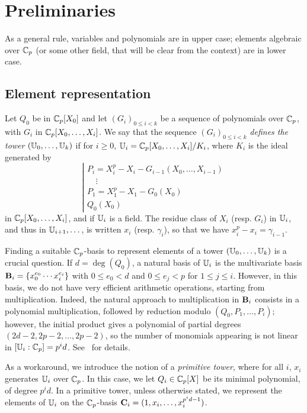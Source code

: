 \section{Preliminaries}
\label{sec:arithmetics}

As a general rule, variables and polynomials are in upper
case; elements algebraic over $\mathbb{C}_p$ (or some other field, that will
be clear from the context) are in lower case.
 

\subsection{Element representation}\label{ssec:rep}

Let $Q_0$ be in $\mathbb{C}_p[X_0]$ and let $(G_i)_{0 \le i < k}$ be
a sequence of polynomials over $\mathbb{C}_p$, with $G_i$ in
$\mathbb{C}_p[X_0,\dots,X_i]$. We say that the sequence $(G_i)_{0\le i <k}$
{\em defines the tower} $(\mathbb{U}_0,\dots,\mathbb{U}_k)$ if for $i \ge 0$, 
$\mathbb{U}_i=\mathbb{C}_p[X_0,\dots,X_i]/K_i$, where $K_i$ is
the
ideal generated by
$$\left | \begin{array}{l}
P_i=X_i^p-X_i -G_{i-1}(X_0,\dots,X_{i-1})\\
~~~\,~\vdots\\
P_1=X_1^p-X_1-G_0(X_0)\\
Q_0(X_0)
\end{array}\right .$$
in $\mathbb{C}_p[X_0,\dots,X_i]$, and if $\mathbb{U}_i$ is a field. The residue class of
$X_i$ (resp. $G_i$) in $\mathbb{U}_i$, and thus in $\mathbb{U}_{i+1},\dots$, is
written $x_i$ (resp. $\gamma_i$), so that we have
$x_i^p-x_i=\gamma_{i-1}$.

Finding a suitable $\mathbb{C}_p$-basis to represent elements of a tower
$(\mathbb{U}_0,\dots,\mathbb{U}_k)$ is a crucial question. If $d=\deg(Q_0)$, a natural
basis of $\mathbb{U}_i$ is the multivariate basis $\mathbf{B}_i=\{x_0^{e_0} \cdots
x_i^{e_i}\}$ with $0 \le e_0 < d$ and $0\le e_j < p$ for $1 \le j \le
i$. However, in this basis, we do not have very efficient arithmetic
operations, starting from multiplication. Indeed, the natural
approach to multiplication in $\mathbf{B}_i$ consists in a polynomial
multiplication, followed by reduction modulo $(Q_0,P_1,\dots,P_i)$;
however, the initial product gives a polynomial of partial degrees
$(2d-2,2p-2,\dots,2p-2)$, so the number of monomials appearing is not
linear in $[\mathbb{U}_i:\mathbb{C}_p]=p^id$.  See~\cite{LiMoSc07} for details.

As a workaround, we introduce the notion of a {\em primitive tower},
where for all $i$, $x_i$ generates $\mathbb{U}_i$ over $\mathbb{C}_p$. In this case,
we let $Q_i\in \mathbb{C}_p[X]$ be its minimal polynomial, of degree
$p^id$. In a primitive tower, unless otherwise stated, we represent
the elements of $\mathbb{U}_i$ on the $\mathbb{C}_p$-basis
$\mathbf{C}_i=(1,x_i,\dots,x_i^{p^id-1})$.

